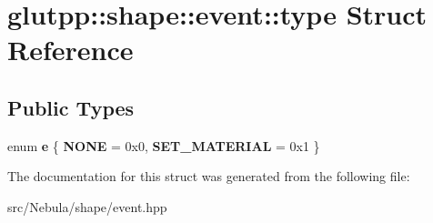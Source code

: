 \hypertarget{structglutpp_1_1shape_1_1event_1_1type}{\section{glutpp\-:\-:shape\-:\-:event\-:\-:type \-Struct \-Reference}
\label{structglutpp_1_1shape_1_1event_1_1type}
}
\subsection*{\-Public \-Types}
\begin{DoxyCompactItemize}
\item 
enum {\bfseries e} \{ {\bfseries \-N\-O\-N\-E} =  0x0, 
{\bfseries \-S\-E\-T\-\_\-\-M\-A\-T\-E\-R\-I\-A\-L} =  0x1
 \}
\end{DoxyCompactItemize}


\-The documentation for this struct was generated from the following file\-:\begin{DoxyCompactItemize}
\item 
src/\-Nebula/shape/event.\-hpp\end{DoxyCompactItemize}
